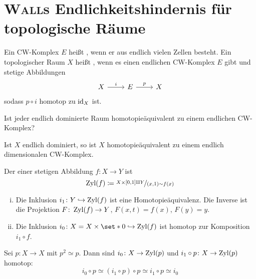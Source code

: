 \section{\textsc{Wall}s Endlichkeitshindernis für topologische Räume} %
\label{sec:4}

\begin{definition}[{name=[{endlicher CW-Komplex}]}]
	Ein CW-Komplex $E$ heißt , wenn er aus endlich vielen Zellen besteht. 
	Ein topologischer Raum $X$ heißt , wenn es einen endlichen CW-Komplex $E$ gibt und stetige Abbildungen
	\[
		\begin{tikzcd}
			X \rar["i"] & E \rar["p"] & X
		\end{tikzcd}
	\]
	sodass $p \circ i$ homotop zu $\operatorname{id}_X$ ist.
\end{definition}

\begin{frage}
	Ist jeder endlich dominierte Raum homotopieäquivalent zu einem endlichen CW-Komplex?
\end{frage}

\begin{satz}[label=satz:endl_dom_endl_cw]
	Ist $X$ endlich dominiert, so ist $X$ homotopieäquivalent zu einem endlich dimensionalen CW-Komplex.
\end{satz}

\begin{definition}[{name=[{Abbildungszylinder}]}]
	Der  einer stetigen Abbildung $f \colon X \to Y$ ist 
	\[
		\operatorname{Zyl}(f) \coloneqq \nicefrac{X \times [0,1] \amalg Y}{(x,1) \sim f(x)}
	\]
\end{definition}

\begin{bemerkung}
	\begin{enumerate}[(i)]
		\item Die Inklusion $i_1 \colon Y \hookrightarrow \operatorname{Zyl}(f)$ ist eine Homotopieäquivalenz.
		Die Inverse ist die Projektion $F \colon \operatorname{Zyl}(f) \to Y$, $F(x,t) = f(x)$, $F(y)=y$.
		\item Die Inklusion $i_0 \colon X = X \times \set*{0} \hookrightarrow \Zyl(f)$ ist homotop zur Komposition $i_1 \circ f$.
	\end{enumerate}
\end{bemerkung}

\begin{beispiel}
	Sei $p \colon X \to X$ mit $p^2 \simeq p$.
	Dann sind $i_0 \colon X \to \operatorname{Zyl}(p)$ und $i_1 \circ p \colon X \to \operatorname{Zyl}(p)$ homotop: 
	\[
		i_0 \circ p \simeq (i_1 \circ p) \circ p \simeq i_1 \circ p \simeq i_0
	\]
\end{beispiel}

